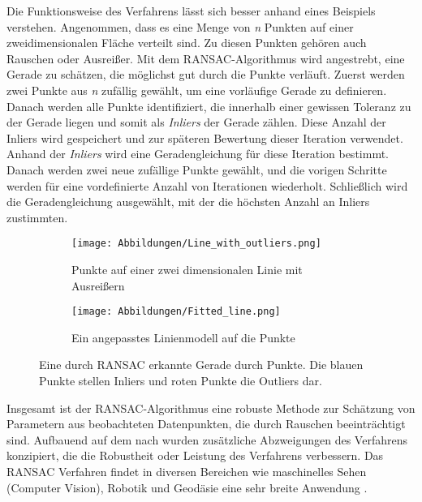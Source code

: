 Die Funktionsweise des Verfahrens lässt sich besser anhand eines Beispiels verstehen. Angenommen, dass es eine Menge von \textit{n} Punkten auf einer zweidimensionalen Fläche verteilt sind. Zu diesen Punkten gehören auch Rauschen oder Ausreißer. Mit dem RANSAC-Algorithmus wird angestrebt, eine Gerade zu schätzen, die möglichst gut durch die Punkte verläuft. Zuerst werden zwei Punkte aus \textit{n} zufällig gewählt, um eine vorläufige Gerade zu definieren. Danach werden alle Punkte identifiziert, die innerhalb einer gewissen Toleranz zu der Gerade liegen und somit als \textit{Inliers} der Gerade zählen. Diese Anzahl der Inliers wird gespeichert und zur späteren Bewertung dieser Iteration verwendet. Anhand der \textit{Inliers} wird eine Geradengleichung für diese Iteration bestimmt. Danach werden zwei neue zufällige Punkte gewählt, und die vorigen Schritte werden für eine vordefinierte Anzahl von Iterationen wiederholt. Schließlich wird die Geradengleichung ausgewählt, mit der die höchsten Anzahl an Inliers zustimmten. 

\begin{figure}[!b]
	\centering
	\begin{subfigure}{0.43\textwidth}
		\texttt{[image: Abbildungen/Line\_with\_outliers.png]}
		\centering
		\caption[Linie mit Ausreißer]{Punkte auf einer zwei dimensionalen Linie mit Ausreißern}
		\label{fig: line_with_outliers}
	\end{subfigure}
	\hfill
	\begin{subfigure}{0.43\textwidth}
		\texttt{[image: Abbildungen/Fitted\_line.png]}
		\centering
		\caption[Linienmodell für eine Linie]{Ein angepasstes Linienmodell auf die Punkte}
		\label{fig: fitted_line}
	\end{subfigure}
	\caption[Visualisierung des RANSAC-Verfahrens]{Eine durch RANSAC erkannte Gerade durch Punkte. Die blauen Punkte stellen Inliers und roten Punkte die Outliers dar.}
	\label{fig: ransac_line}
\end{figure}

Insgesamt ist der RANSAC-Algorithmus eine robuste Methode zur Schätzung von Parametern aus beobachteten Datenpunkten, die durch Rauschen beeinträchtigt sind. Aufbauend auf dem nach \textcite{fischler_random_1981} wurden zusätzliche Abzweigungen des Verfahrens konzipiert, die die Robustheit oder Leistung des Verfahrens verbessern. Das RANSAC Verfahren findet in diversen Bereichen wie maschinelles Sehen (Computer Vision), Robotik und Geodäsie eine sehr breite Anwendung \autocite[2]{martinez-otzeta_ransac_2023}.

